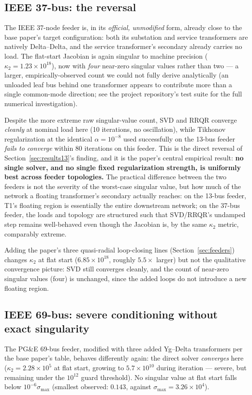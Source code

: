 \documentclass[conference]{IEEEtran}
\begin{document}
\subsection{IEEE 37-bus: the reversal}
\label{sec:results37}
The IEEE 37-node feeder is, in its \emph{official, unmodified} form,
already close to the base paper's target configuration: both its
substation and service transformers are natively Delta--Delta, and the
service transformer's secondary already carries no load. The flat-start
Jacobian is again singular to machine precision
($\kappa_2 = 1.23\times10^{18}$), now with \emph{four} near-zero singular
values rather than two --- a larger, empirically-observed count we could
not fully derive analytically (an unloaded leaf bus behind one transformer
appears to contribute more than a single common-mode direction; see the
project repository's test suite for the full numerical investigation).

Despite the more extreme raw singular-value count, SVD and RRQR converge
\emph{cleanly} at nominal load here (10 iterations, no oscillation), while
Tikhonov regularization at the identical $\alpha = 10^{-8}$ used
successfully on the 13-bus feeder \emph{fails to converge} within 80
iterations on this feeder. This is the direct reversal of
Section~\ref{sec:results13}'s finding, and it is the paper's central
empirical result: \textbf{no single solver, and no single fixed
regularization strength, is uniformly best across feeder topologies.} The
practical difference between the two feeders is not the severity of the
worst-case singular value, but how much of the network a floating
transformer's secondary actually reaches: on the 13-bus feeder, T1's
floating region is essentially the entire downstream network; on the
37-bus feeder, the loads and topology are structured such that SVD/RRQR's
undamped step remains well-behaved even though the Jacobian is, by the
same $\kappa_2$ metric, comparably extreme.

Adding the paper's three quasi-radial loop-closing lines
(Section~\ref{sec:feeders}) changes $\kappa_2$ at flat start
($6.85\times10^{18}$, roughly $5.5\times$ larger) but not the qualitative
convergence picture: SVD still converges cleanly, and the count of
near-zero singular values (four) is unchanged, since the added loops do
not introduce a new floating region.

\subsection{IEEE 69-bus: severe conditioning without exact singularity}
\label{sec:results69}
The PG\&E 69-bus feeder, modified with three added Yg--Delta transformers
per the base paper's table, behaves differently again: the direct solver
\emph{converges} here ($\kappa_2 = 2.28\times10^5$ at flat start, growing to
$5.7\times10^{10}$ during iteration --- severe, but remaining under the
$10^{12}$ guard threshold). No singular value at flat start falls below
$10^{-6}\sigma_{\max}$ (smallest observed: $0.143$, against
$\sigma_{\max} = 3.26\times10^4$).
\end{document}
